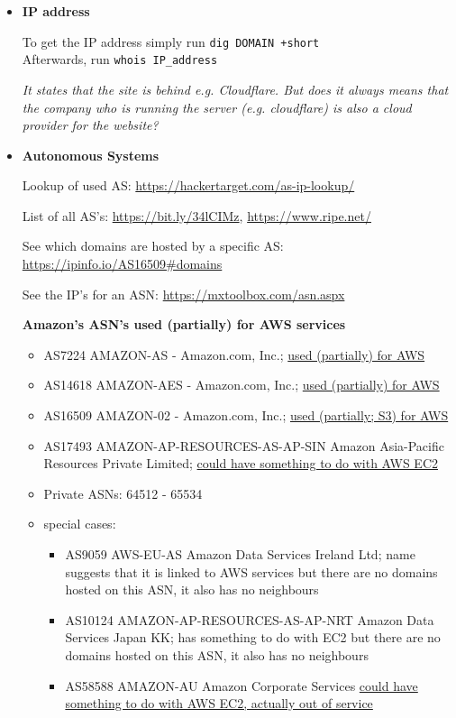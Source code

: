 \documentclass[12pt]{article}
\begin{document}
\begin{itemize}
    
    \item \textbf{IP address}
    
    To get the IP address simply run \verb|dig DOMAIN +short| \\
    Afterwards, run \verb|whois IP_address| 
    
    \textit{It states that the site is behind e.g. Cloudflare. But does it always means that the company who is running the server (e.g. cloudflare) is also a cloud provider for the website?}
    
    
    \item \textbf{Autonomous Systems}
    
    Lookup of used AS: \url{https://hackertarget.com/as-ip-lookup/}
    
    List of all AS's: \url{https://bit.ly/34lCIMz}, \url{https://www.ripe.net/}
    
    See which domains are hosted by a specific AS: \url{https://ipinfo.io/AS16509#domains}
        
    See the IP's for an ASN: \url{https://mxtoolbox.com/asn.aspx}
    
    \textbf{Amazon's ASN's used (partially) for AWS services}
    \begin{itemize}
        \item AS7224  AMAZON-AS - Amazon.com, Inc.; \href{https://search.arin.net/rdap/?query=AS7224}{used (partially) for AWS}
        \item AS14618 AMAZON-AES - Amazon.com, Inc.; \href{https://search.arin.net/rdap/?query=AS14618}{used (partially) for AWS}
        \item AS16509 AMAZON-02 - Amazon.com, Inc.; \href{https://search.arin.net/rdap/?query=AS16509}{used (partially; S3) for AWS}
        
        \item AS17493 AMAZON-AP-RESOURCES-AS-AP-SIN Amazon Asia-Pacific Resources Private Limited; \href{https://stat.ripe.net/app/launchpad/S1_17493_C13C31C4C34C9C22C28C20C15C6C7C14C26C29C30C17C2C21C33C16C10}{could have something to do with AWS EC2}
        \item Private ASNs: 64512 - 65534
        
        \item special cases:
        \begin{itemize}
            \item AS9059  AWS-EU-AS Amazon Data Services Ireland Ltd; name suggests that it is linked to AWS services but there are no domains hosted on this ASN, it also has no neighbours
            \item AS10124 AMAZON-AP-RESOURCES-AS-AP-NRT Amazon Data Services Japan KK; has something to do with EC2 but there are no domains hosted on this ASN, it also has no neighbours
            \item AS58588 AMAZON-AU Amazon Corporate Services \href{https://stat.ripe.net/app/launchpad/S1_58588_C13C31C4C34C9C22C28C20C15C6C7C14C26C29C30C17C2C21C33C16C10}{could have something to do with AWS EC2, actually out of service}
        \end{itemize}
        

\end{itemize}
\end{itemize}
\end{document}
